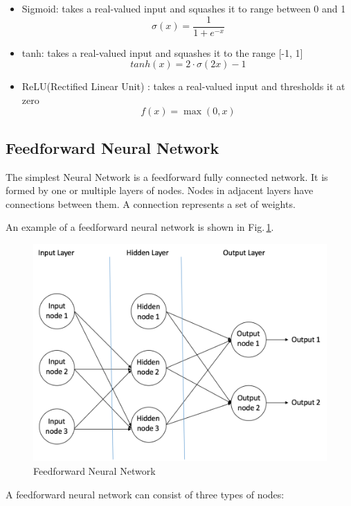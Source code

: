 \begin{itemize}
  \item Sigmoid: takes a real-valued input and squashes it to range between 0 and 1
        $$ \sigma(x) =  \frac{\mathrm{1} }{\mathrm{1} + e^{-x} }  $$ 
  \item tanh: takes a real-valued input and squashes it to the range [-1, 1]
        $$ tanh(x) = 2\cdot\sigma(2x)-1 $$
        
  \item ReLU(Rectified Linear Unit) \citep{Nair:2010:RLU:3104322.3104425}: takes a real-valued input and thresholds it at zero
        $$f(x) = \max(0,x)$$
\end{itemize}

\subsection{Feedforward Neural Network}

The simplest Neural Network is a feedforward fully connected network. It is formed by one or multiple layers of nodes. Nodes in adjacent layers have connections between them. A connection represents a set of weights.


\noindent An example of a feedforward neural network is shown in Fig.\,\ref{feedforward}.
\begin{figure}[h]
	\centering
	\includegraphics[scale=0.5]{Figs/feedforward.png}
    \caption{Feedforward Neural Network}
    \label{feedforward}
\end{figure}

A feedforward neural network can consist of three types of nodes:

